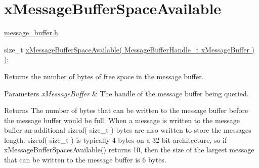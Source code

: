 \hypertarget{group__x_message_buffer_space_available}{}\section{x\+Message\+Buffer\+Space\+Available}
\label{group__x_message_buffer_space_available}
\hyperlink{message__buffer_8h}{message\+\_\+buffer.\+h} 
\begin{DoxyPre}
size\_t \hyperlink{message__buffer_8h_a9f1e75a283ef603e914e10ae354e5ab8}{xMessageBufferSpaceAvailable( MessageBufferHandle\_t xMessageBuffer )} );
\end{DoxyPre}
 Returns the number of bytes of free space in the message buffer.


\begin{DoxyParams}{Parameters}
{\em x\+Message\+Buffer} & The handle of the message buffer being queried.\\
\hline
\end{DoxyParams}
\begin{DoxyReturn}{Returns}
The number of bytes that can be written to the message buffer before the message buffer would be full. When a message is written to the message buffer an additional sizeof( size\+\_\+t ) bytes are also written to store the message\textquotesingle{}s length. sizeof( size\+\_\+t ) is typically 4 bytes on a 32-\/bit architecture, so if x\+Message\+Buffer\+Spaces\+Available() returns 10, then the size of the largest message that can be written to the message buffer is 6 bytes. 
\end{DoxyReturn}
